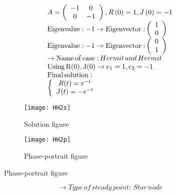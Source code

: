 \documentclass[a4paper]{article}
\begin{document}
\[\begin{array}{l}
A = \left( {\begin{array}{*{20}{c}}
{ - 1}&0\\
0&{ - 1}
\end{array}} \right),R\left( 0 \right) = 1,J\left( 0 \right) =  - 1\\
{\rm{Eigenvalue: - 1}} \to {\rm{Eigenvector:}}\left( {\begin{array}{*{20}{c}}
1\\
0
\end{array}} \right)\\
{\rm{Eigenvalue: - 1}} \to {\rm{Eigenvector:}}\left( {\begin{array}{*{20}{c}}
0\\
1
\end{array}} \right)\\
 \to {\rm{Name}}\,{\rm{of}}\,{\rm{case:}}\,Hermit\,and\,Hermit\\
{\rm{Using}}\,{\rm{R(0), J(0)}} \to {{\rm{c}}_1} = 1,{\rm{ }}{{\rm{c}}_2} =  - 1\\
{\rm{Final}}\,{\rm{solution:}}\\
\left\{ {\begin{array}{*{20}{c}}
{R(t) = {e^{ - t}}}\\
{J(t) =  - {e^{ - t}}}
\end{array}} \right.
\end{array}\]
\begin{figure}[H]
\centering
\begin{subfigure}{.5\textwidth}
  \centering
  \texttt{[image: HH2s]}
  \caption*{Solution figure}
\end{subfigure}%
\begin{subfigure}{.5\textwidth}
  \centering
  \texttt{[image: HH2p]}
  \caption*{Phase-portrait figure}
\end{subfigure}
\end{figure}
\[  \to  Type\,of\,steady\,point:\,Star\,node\]
\end{document}
